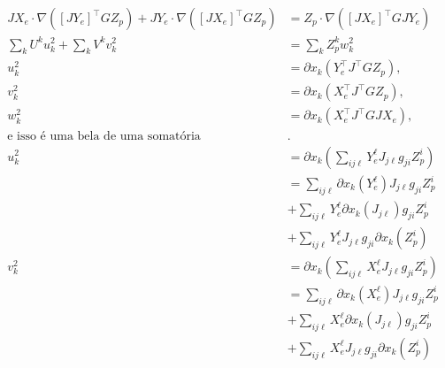 \documentclass[12pt]{article}
\begin{document}
		\begin{align}
		J X_e \cdot \nabla ([J Y_e]^\top G Z_p) + J Y_e \cdot \nabla ([J X_e]^\top G Z_p) &= Z_p \cdot \nabla ([J X_e]^\top G J Y_e) \\
		\sum_k U^k u_k^2 + \sum_k V^k v_k^2 &= \sum_k Z_p^k w_k^2 \\
		u_k^2 &= \partial x_k (Y_e^\top J^\top G Z_p), \\
		v_k^2 &= \partial x_k (X_e^\top J^\top G Z_p), \\
		w_k^2 &= \partial x_k (X_e^\top J^\top G J X_e), \\
		\text{e isso \'e uma bela de uma somat\'oria}&. \\
		u_k^2 &= \partial x_k \left(\sum_{ij\ell} Y_e^\ell J_{j\ell} g_{ji} Z_p^i \right) \\
		 &= \sum_{ij\ell} \partial x_k (Y_e^\ell) J_{j\ell} g_{ji} Z_p^i \\
		 &+ \sum_{ij\ell} Y_e^\ell \partial x_k (J_{j\ell}) g_{ji} Z_p^i \\
		 &+ \sum_{ij\ell} Y_e^\ell J_{j\ell} g_{ji} \partial x_k (Z_p^i) \\
		v_k^2 &= \partial x_k \left(\sum_{ij\ell} X_e^\ell J_{j\ell} g_{ji} Z_p^i \right) \\
		 &= \sum_{ij\ell} \partial x_k (X_e^\ell) J_{j\ell} g_{ji} Z_p^i \\
		 &+ \sum_{ij\ell} X_e^\ell \partial x_k (J_{j\ell}) g_{ji} Z_p^i \\
		 &+ \sum_{ij\ell} X_e^\ell J_{j\ell} g_{ji} \partial x_k (Z_p^i)
		\end{align}
\end{document}
